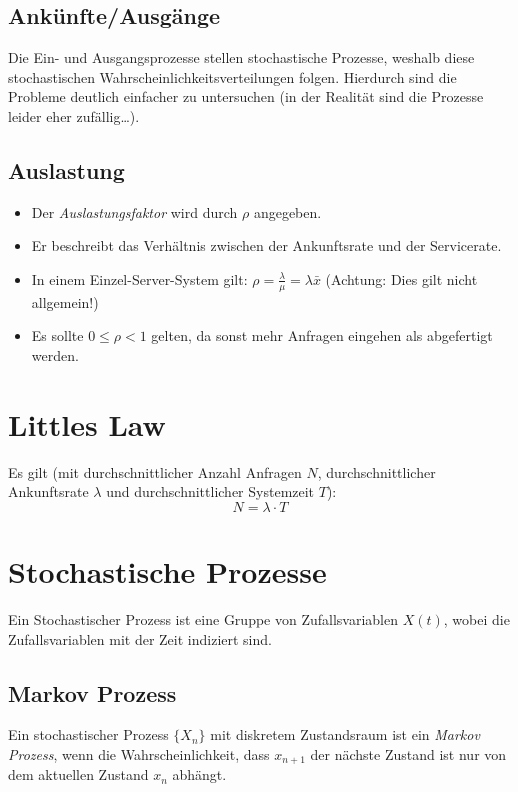 		\subsection{Ankünfte/Ausgänge}
			Die Ein- und Ausgangsprozesse stellen stochastische Prozesse, weshalb diese stochastischen Wahrscheinlichkeitsverteilungen folgen. Hierdurch sind die Probleme deutlich einfacher zu untersuchen (in der Realität sind die Prozesse leider eher zufällig\dots).

		\subsection{Auslastung}
			\begin{itemize}
				\item Der \textit{Auslastungsfaktor} wird durch \( \rho \) angegeben.
				\item Er beschreibt das Verhältnis zwischen der Ankunftsrate und der Servicerate.
				\item In einem Einzel-Server-System gilt: \( \rho = \frac{\lambda}{\mu} = \lambda \bar{x} \) (Achtung: Dies gilt nicht allgemein!)
				\item Es sollte \( 0 \leq \rho < 1 \) gelten, da sonst mehr Anfragen eingehen als abgefertigt werden.
			\end{itemize}

	\section{Littles Law}
		Es gilt (mit durchschnittlicher Anzahl Anfragen \(N\), durchschnittlicher Ankunftsrate \(\lambda\) und durchschnittlicher Systemzeit \(T\)):
		\begin{equation*}
			N = \lambda \cdot T
		\end{equation*}

	\section{Stochastische Prozesse}
		Ein Stochastischer Prozess ist eine Gruppe von Zufallsvariablen \( X(t) \), wobei die Zufallsvariablen mit der Zeit indiziert sind.

		\subsection{Markov Prozess}
			Ein stochastischer Prozess \( \{ X _ n \} \) mit diskretem Zustandsraum ist ein \textit{Markov Prozess}, wenn die Wahrscheinlichkeit, dass \( x _ {n + 1} \) der nächste Zustand ist nur von dem aktuellen Zustand \( x _ n \) abhängt.

